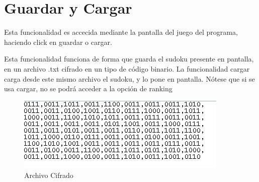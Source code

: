 \section{Guardar y Cargar }
Esta funcionalidad es accecida mediante la pantalla del juego del programa, haciendo click en guardar o cargar.


Esta funcionalidad funciona de forma que guarda el sudoku presente en pantalla, en un archivo .txt cifrado en un tipo de código binario.
La funcionalidad cargar carga desde este mismo archivo el sudoku, y lo pone en pantalla. Nótese que si se usa cargar, no se podrá acceder a la opción de ranking
\begin{figure}[htbp]
\begin{center}
\includegraphics[width=.60\textwidth]{./imagenes/7.jpg}
\caption{Archivo Cifrado}
\label{Archivo Cifrado}
\end{center}
\end{figure}